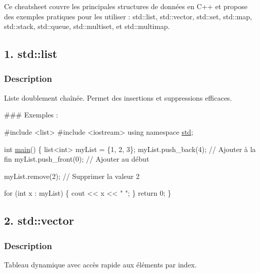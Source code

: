 Ce cheatsheet couvre les principales structures de données en C++ et propose des exemples pratiques pour les utiliser \+: {\ttfamily std\+::list}, {\ttfamily std\+::vector}, {\ttfamily std\+::set}, {\ttfamily std\+::map}, {\ttfamily std\+::stack}, {\ttfamily std\+::queue}, {\ttfamily std\+::multiset}, et {\ttfamily std\+::multimap}. 



\subsection*{1. std\+::list}

\subsubsection*{Description}

Liste doublement chaînée. Permet des insertions et suppressions efficaces.

\#\#\# Exemples \+: 
\begin{DoxyCode}
\textcolor{preprocessor}{#include <list>}
\textcolor{preprocessor}{#include <iostream>}
\textcolor{keyword}{using namespace }\hyperlink{namespacestd}{std};

\textcolor{keywordtype}{int} \hyperlink{htop_8c_a3c04138a5bfe5d72780bb7e82a18e627}{main}() \{
    list<int> myList = \{1, 2, 3\};
    myList.push\_back(4); \textcolor{comment}{// Ajouter à la fin}
    myList.push\_front(0); \textcolor{comment}{// Ajouter au début}

    myList.remove(2); \textcolor{comment}{// Supprimer la valeur 2}

    \textcolor{keywordflow}{for} (\textcolor{keywordtype}{int} x : myList) \{
        cout << x << \textcolor{stringliteral}{" "};
    \}
    \textcolor{keywordflow}{return} 0;
\}
\end{DoxyCode}




\subsection*{2. std\+::vector}

\subsubsection*{Description}

Tableau dynamique avec accès rapide aux éléments par index.

